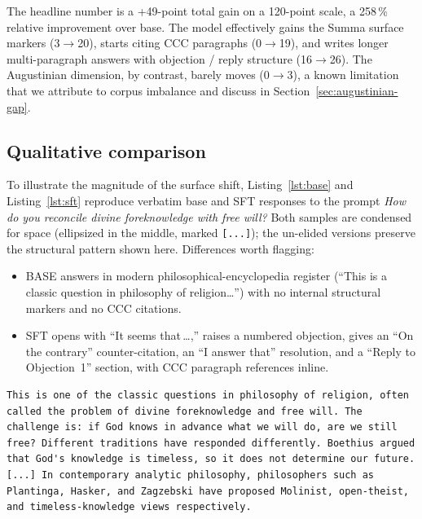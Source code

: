 The headline number is a +49-point total gain on a 120-point scale, a
258\,\% relative improvement over base. The model effectively gains
the Summa surface markers (3$\to$20), starts citing CCC paragraphs
(0$\to$19), and writes longer multi-paragraph answers with objection /
reply structure (16$\to$26). The Augustinian dimension, by contrast,
barely moves (0$\to$3), a known limitation that we attribute to
corpus imbalance and discuss in Section~\ref{sec:augustinian-gap}.

\subsection{Qualitative comparison}
\label{sec:qualitative}

To illustrate the magnitude of the surface shift,
Listing~\ref{lst:base} and Listing~\ref{lst:sft} reproduce verbatim base
and SFT responses to the prompt \emph{How do you reconcile divine
foreknowledge with free will?} Both samples are condensed for space
(ellipsized in the middle, marked \verb|[...]|); the un-elided versions
preserve the structural pattern shown here. Differences worth flagging:

\begin{itemize}
  \item BASE answers in modern philosophical-encyclopedia register
        (``This is a classic question in philosophy of religion\dots'')
        with no internal structural markers and no CCC citations.
  \item SFT opens with ``It seems that\,\dots,'' raises a numbered
        objection, gives an ``On the contrary'' counter-citation, an ``I
        answer that'' resolution, and a ``Reply to Objection~1''
        section, with CCC paragraph references inline.
\end{itemize}

\begin{lstlisting}[caption={BASE (Qwen 2.5\,7B-Instruct, no adapter)},
                    label=lst:base,frame=single]
This is one of the classic questions in philosophy of religion, often
called the problem of divine foreknowledge and free will. The
challenge is: if God knows in advance what we will do, are we still
free? Different traditions have responded differently. Boethius argued
that God's knowledge is timeless, so it does not determine our future.
[...] In contemporary analytic philosophy, philosophers such as
Plantinga, Hasker, and Zagzebski have proposed Molinist, open-theist,
and timeless-knowledge views respectively.
\end{lstlisting}

